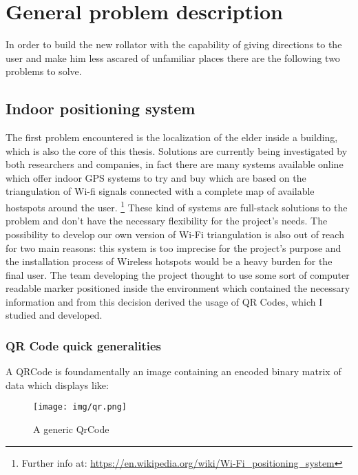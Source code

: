 \chapter{General problem description}

\vspace{6cm}
In order to build the new rollator with the capability of giving directions to
the user and make him less ascared of unfamiliar places there are the following
two problems to solve.
\newpage

\section{Indoor positioning system}
The first problem encountered is the localization of the elder inside a
building, which is also the core of this thesis.
Solutions are currently being investigated by both researchers and companies, in fact there are many systems available online which offer indoor 
GPS systems to try and buy which are based on the triangulation of Wi-fi signals connected with a
complete map of available hostspots around the user.
\footnote{Further info at: 
\url{https://en.wikipedia.org/wiki/Wi-Fi_positioning_system}}
These kind of systems are full-stack solutions to the problem and don't have the
necessary flexibility for the project's needs.
The possibility to develop our own version of Wi-Fi triangulation is also out of reach for two main reasons:
this system is too imprecise for the project's purpose and the installation process of Wireless hotspots would be a heavy burden for the final user.
\newline
The team developing the project thought to use some sort of computer readable 
marker positioned inside the environment which contained the necessary information
and from this decision derived the usage of QR Codes, which I studied and
developed.

\subsection{QR Code quick generalities}
A QRCode is foundamentally an image containing an encoded binary matrix of data which displays like:
\begin{figure}[hbt]
    \centering
    \caption{A generic QrCode}
    \texttt{[image: img/qr.png]}
\end{figure}

